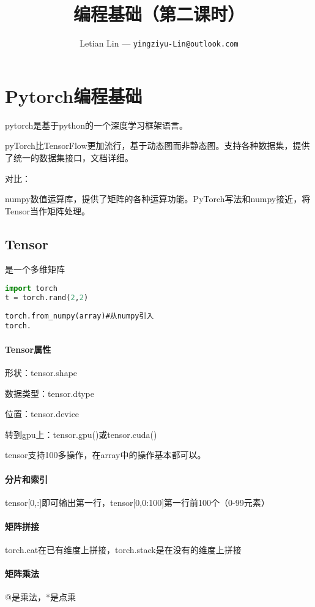 \documentclass[UTF8]{ctexart}
\title{
	编程基础（第二课时）
}
\author{
	Letian Lin --- \texttt{yingziyu-Lin@outlook.com}
}
\begin{document}
\maketitle

\section{Pytorch编程基础}
pytorch是基于python的一个深度学习框架语言。

pyTorch比TensorFlow更加流行，基于动态图而非静态图。支持各种数据集，提供了统一的数据集接口，文档详细。

对比：

numpy数值运算库，提供了矩阵的各种运算功能。PyTorch写法和numpy接近，将Tensor当作矩阵处理。

\subsection{Tensor}
是一个多维矩阵

\begin{lstlisting}[language=Python]
import torch
t = torch.rand(2,2)
\end{lstlisting}

\begin{lstlisting}
torch.from_numpy(array)#从numpy引入
torch.
\end{lstlisting}
\paragraph{Tensor属性}
形状：tensor.shape

数据类型：tensor.dtype

位置：tensor.device

转到gpu上：tensor.gpu()或tensor.cuda()

tensor支持100多操作，在array中的操作基本都可以。

\paragraph{分片和索引}tensor[0,:]即可输出第一行，tensor[0,0:100]第一行前100个（0-99元素）

\paragraph{矩阵拼接}torch.cat在已有维度上拼接，torch.stack是在没有的维度上拼接

\paragraph{矩阵乘法}@是乘法，*是点乘
\end{document}
